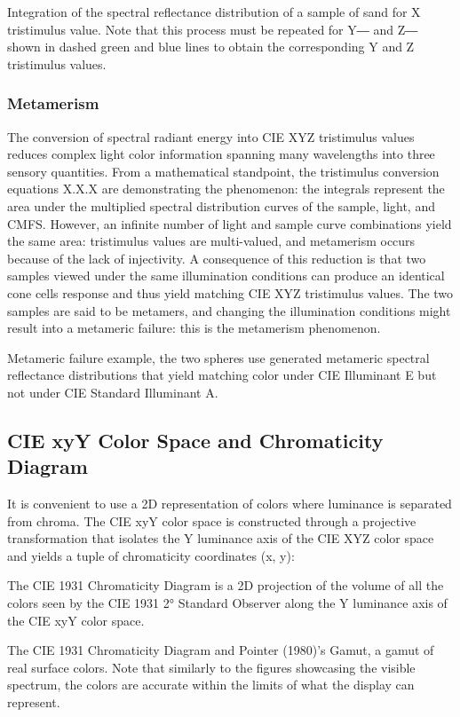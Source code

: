 Integration of the spectral reflectance distribution of a sample of sand for X tristimulus value. Note that this process must be repeated for Y― and Z― shown in dashed green and blue lines to obtain the corresponding Y and Z tristimulus values.

\subsubsection{Metamerism}

The conversion of spectral radiant energy into CIE XYZ tristimulus values reduces complex light color information spanning many wavelengths into three sensory quantities. From a mathematical standpoint, the tristimulus conversion equations X.X.X are demonstrating the phenomenon: the integrals represent the area under the multiplied spectral distribution curves of the sample, light, and CMFS. However, an infinite number of light and sample curve combinations yield the same area: tristimulus values are multi-valued, and metamerism occurs because of the lack of injectivity. A consequence of this reduction is that two samples viewed under the same illumination conditions can produce an identical cone cells response and thus yield matching CIE XYZ tristimulus values. The two samples are said to be metamers, and changing the illumination conditions might result into a metameric failure: this is the metamerism phenomenon.


Metameric failure example, the two spheres use generated metameric spectral reflectance distributions that yield matching color under CIE Illuminant E but not under CIE Standard Illuminant A.

\subsection{CIE xyY Color Space and Chromaticity Diagram}

It is convenient to use a 2D representation of colors where luminance is separated from chroma. The CIE xyY color space is constructed through a projective transformation that isolates the Y luminance axis of the CIE XYZ color space and yields a tuple of chromaticity coordinates (x, y):

The CIE 1931 Chromaticity Diagram is a 2D projection of the volume of all the colors seen by the CIE 1931 2° Standard Observer along the Y luminance axis of the CIE xyY color space.

The CIE 1931 Chromaticity Diagram and Pointer (1980)'s Gamut, a gamut of real surface colors. Note that similarly to the figures showcasing the visible spectrum, the colors are accurate within the limits of what the display can represent.

